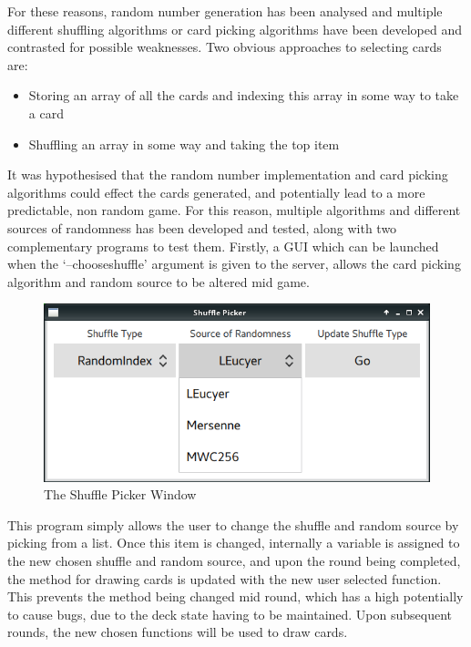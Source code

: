 For these reasons, random number generation has been analysed and multiple
different shuffling algorithms or card picking algorithms have been
developed and contrasted for possible weaknesses. Two obvious approaches to 
selecting cards are:

\begin{itemize}
    \item Storing an array of all the cards and indexing this array in some way to take a card
    \item Shuffling an array in some way and taking the top item
\end{itemize}

\newpage

It was hypothesised that the random number implementation and card picking
algorithms could effect the cards generated, and potentially lead to a more
predictable, non random game. For this reason, multiple algorithms and
different sources of randomness has been developed and tested, along with two
complementary programs to test them. Firstly, a GUI which can be launched
when the `--chooseshuffle' argument is given to the server, allows the card
picking algorithm and random source to be altered mid game.

\begin{figure}[H]
    \centering
    \includegraphics[width=0.8\linewidth]{../images/shufflepicker.png}
    \caption{The Shuffle Picker Window}%
    \label{fig:shufflepicker}
\end{figure}

This program simply allows the user to change the shuffle and random source
by picking from a list. Once this item is changed, internally a variable is
assigned to the new chosen shuffle and random source, and upon the round
being completed, the method for drawing cards is updated with the new user
selected function. This prevents the method being changed mid round, which
has a high potentially to cause bugs, due to the deck state having to be
maintained. Upon subsequent rounds, the new chosen functions will be used
to draw cards.


